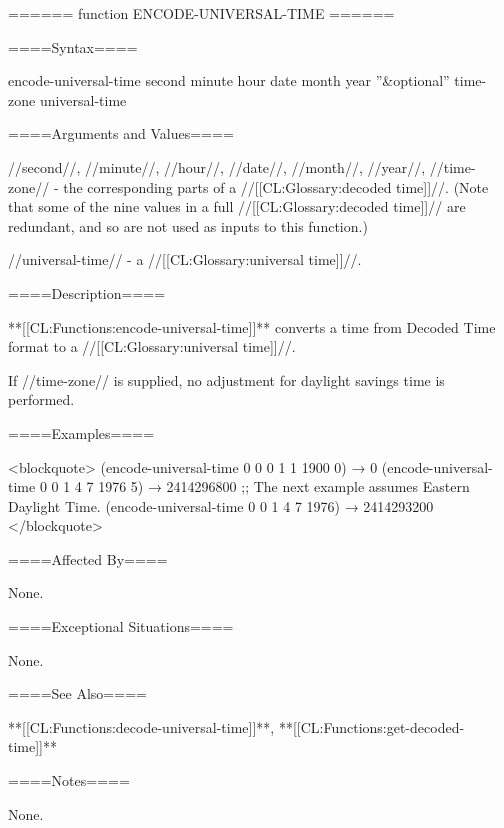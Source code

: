 ====== function ENCODE-UNIVERSAL-TIME ======

====Syntax====

\DefunWithValuesNewline encode-universal-time {second minute hour date month year ''&optional'' time-zone} {universal-time}

====Arguments and Values====

//second//, //minute//, //hour//, //date//, //month//, //year//, //time-zone// - the corresponding parts of a //[[CL:Glossary:decoded time]]//. (Note that some of the nine values in a full //[[CL:Glossary:decoded time]]// are redundant, and so are not used as inputs to this function.)

//universal-time// - a //[[CL:Glossary:universal time]]//.

====Description====

**[[CL:Functions:encode-universal-time]]** converts a time from Decoded Time format to a //[[CL:Glossary:universal time]]//.

If //time-zone// is supplied, no adjustment for daylight savings time is performed.

====Examples====

<blockquote> (encode-universal-time 0 0 0 1 1 1900 0) → 0 (encode-universal-time 0 0 1 4 7 1976 5) → 2414296800 ;; The next example assumes Eastern Daylight Time. (encode-universal-time 0 0 1 4 7 1976) → 2414293200 </blockquote>

====Affected By====

None.

====Exceptional Situations====

None.

====See Also====

**[[CL:Functions:decode-universal-time]]**, **[[CL:Functions:get-decoded-time]]**

====Notes====

None.

